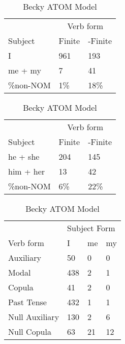 \begin{table}[]
    \caption{Becky ATOM Model}
    \begin{minipage}{0.5\textwidth}
    \centering
    \begin{tabular}{@{}lll@{}}
        \toprule
         &\multicolumn{2}{c}{Verb form}\\
         \cline{2-3}
        Subject & Finite & -Finite \\
        \midrule
        I & 961 & 193 \\
        me + my & 7 & 41 \\
        \hline
        \%non-NOM & 1\% & 18\% \\
        \bottomrule
    \end{tabular}
\end{minipage}
\begin{minipage}{0.5\textwidth}
    \centering
    \begin{tabular}{@{}lll@{}}
        \toprule
         &\multicolumn{2}{c}{Verb form}\\
         \cline{2-3}
        Subject & Finite & -Finite \\
        \midrule
        he + she & 204 & 145 \\
        him + her & 13 & 42 \\
        \hline
        \%non-NOM & 6\% & 22\% \\
        \bottomrule
    \end{tabular}
    \end{minipage}
    \begin{minipage}{0.5\textwidth}
    \centering
    \begin{tabular}{@{}llll@{}}
        \toprule
            &\multicolumn{3}{l}{Subject Form}\\
            \cline{2-4}
        Verb form & I & me & my \\
        \midrule
        Auxiliary & 50 & 0 & 0 \\
        Modal & 438 & 2 & 1 \\
        Copula & 41 & 2 & 0 \\
        Past Tense & 432 & 1 & 1 \\
        \hline
        Null Auxiliary & 130 & 2 & 6 \\
        Null Copula & 63 & 21 & 12 \\
        \bottomrule
    \end{tabular}

\end{minipage}
\end{table}
